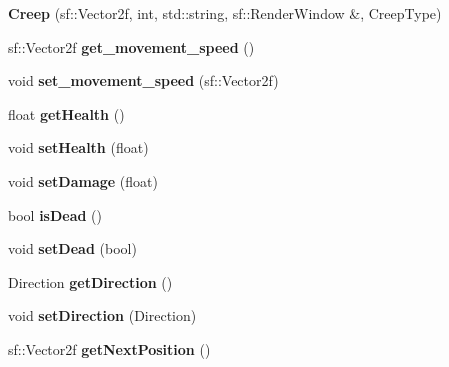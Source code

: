 \begin{DoxyCompactItemize}
\item 
\hypertarget{class_creep_af2bca124f090479d6030dcd8b544207d}{{\bfseries Creep} (sf\+::\+Vector2f, int, std\+::string, sf\+::\+Render\+Window \&, Creep\+Type)}\label{class_creep_af2bca124f090479d6030dcd8b544207d}

\item 
\hypertarget{class_creep_ae7dcb7a0f4aec64cd60cef930b479d74}{sf\+::\+Vector2f {\bfseries get\+\_\+movement\+\_\+speed} ()}\label{class_creep_ae7dcb7a0f4aec64cd60cef930b479d74}

\item 
\hypertarget{class_creep_aee12b238fa3a5ce6668a8a8101dcbeef}{void {\bfseries set\+\_\+movement\+\_\+speed} (sf\+::\+Vector2f)}\label{class_creep_aee12b238fa3a5ce6668a8a8101dcbeef}

\item 
\hypertarget{class_creep_acde92da85582d21777ebb9ddcd42edeb}{float {\bfseries get\+Health} ()}\label{class_creep_acde92da85582d21777ebb9ddcd42edeb}

\item 
\hypertarget{class_creep_acf5018797b9efb2db9323849a92ee917}{void {\bfseries set\+Health} (float)}\label{class_creep_acf5018797b9efb2db9323849a92ee917}

\item 
\hypertarget{class_creep_ab3f4b0503792e2148c8e3a7253e26f90}{void {\bfseries set\+Damage} (float)}\label{class_creep_ab3f4b0503792e2148c8e3a7253e26f90}

\item 
\hypertarget{class_creep_ac05720ea0d364e963c2ebb7887845e69}{bool {\bfseries is\+Dead} ()}\label{class_creep_ac05720ea0d364e963c2ebb7887845e69}

\item 
\hypertarget{class_creep_a42f5e64b1097d18ab1368927929dba1b}{void {\bfseries set\+Dead} (bool)}\label{class_creep_a42f5e64b1097d18ab1368927929dba1b}

\item 
\hypertarget{class_creep_a99ff0eb99afaabe3c1bf0fed162d6120}{Direction {\bfseries get\+Direction} ()}\label{class_creep_a99ff0eb99afaabe3c1bf0fed162d6120}

\item 
\hypertarget{class_creep_a7f6eeaa0bb773bd7aaab0013f7f3a176}{void {\bfseries set\+Direction} (Direction)}\label{class_creep_a7f6eeaa0bb773bd7aaab0013f7f3a176}

\item 
\hypertarget{class_creep_a4ef90263150dca3d6dac6f2e985b4928}{sf\+::\+Vector2f {\bfseries get\+Next\+Position} ()}\label{class_creep_a4ef90263150dca3d6dac6f2e985b4928}


\end{DoxyCompactItemize}
